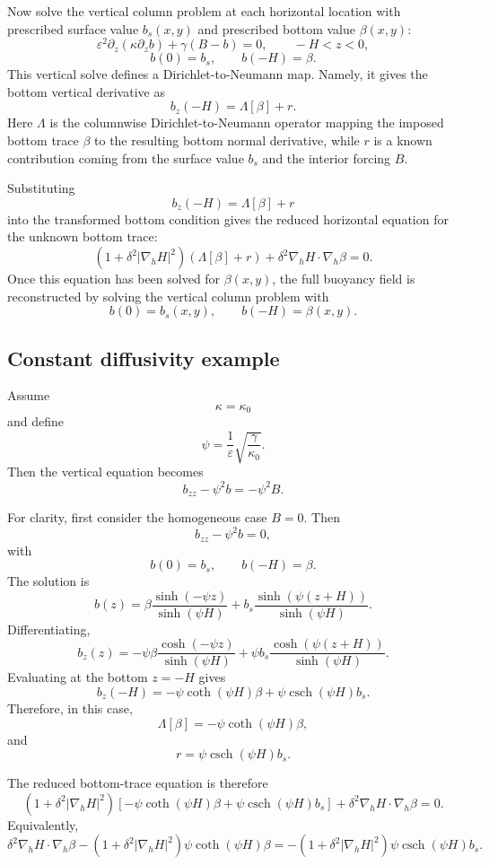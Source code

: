 \documentclass[11pt]{amsart}
\begin{document}
Now solve the vertical column problem at each horizontal location with prescribed surface value \(b_s(x,y)\) and prescribed bottom value \(\beta(x,y)\):
\[
\varepsilon^2 \partial_z\left(\kappa \partial_z b\right)
+\gamma(B-b)=0,
\qquad -H<z<0,
\]
\[
b(0)=b_s,
\qquad
b(-H)=\beta.
\]
This vertical solve defines a Dirichlet-to-Neumann map. Namely, it gives the bottom vertical derivative as
\[
b_z(-H)=\Lambda[\beta]+r.
\]
Here \(\Lambda\) is the columnwise Dirichlet-to-Neumann operator mapping the imposed bottom trace \(\beta\) to the resulting bottom normal derivative, while \(r\) is a known contribution coming from the surface value \(b_s\) and the interior forcing \(B\).

Substituting
\[
b_z(-H)=\Lambda[\beta]+r
\]
into the transformed bottom condition gives the reduced horizontal equation for the unknown bottom trace:
\[
\boxed{
\left(1+\delta^2 |\nabla_h H|^2\right)
\left(\Lambda[\beta]+r\right)
+
\delta^2 \nabla_h H\cdot \nabla_h \beta
=0.
}
\]
Once this equation has been solved for \(\beta(x,y)\), the full buoyancy field is reconstructed by solving the vertical column problem with
\[
b(0)=b_s(x,y),
\qquad
b(-H)=\beta(x,y).
\]

\subsection{Constant diffusivity example}

Assume
\[
\kappa=\kappa_0
\]
and define
\[
\psi=\frac{1}{\varepsilon}\sqrt{\frac{\gamma}{\kappa_0}}.
\]
Then the vertical equation becomes
\[
b_{zz}-\psi^2 b=-\psi^2 B.
\]

For clarity, first consider the homogeneous case \(B=0\). Then
\[
b_{zz}-\psi^2 b=0,
\]
with
\[
b(0)=b_s,
\qquad
b(-H)=\beta.
\]
The solution is
\[
b(z)
=
\beta
\frac{\sinh(-\psi z)}{\sinh(\psi H)}
+
b_s
\frac{\sinh(\psi(z+H))}{\sinh(\psi H)}.
\]
Differentiating,
\[
b_z(z)
=
-\psi\beta
\frac{\cosh(-\psi z)}{\sinh(\psi H)}
+
\psi b_s
\frac{\cosh(\psi(z+H))}{\sinh(\psi H)}.
\]
Evaluating at the bottom \(z=-H\) gives
\[
b_z(-H)
=
-\psi \coth(\psi H)\beta
+
\psi \operatorname{csch}(\psi H)b_s.
\]
Therefore, in this case,
\[
\Lambda[\beta]
=
-\psi \coth(\psi H)\beta,
\]
and
\[
r=
\psi \operatorname{csch}(\psi H)b_s.
\]

The reduced bottom-trace equation is therefore
\[
\left(1+\delta^2 |\nabla_h H|^2\right)
\left[
-\psi \coth(\psi H)\beta
+
\psi \operatorname{csch}(\psi H)b_s
\right]
+
\delta^2 \nabla_h H\cdot \nabla_h \beta
=0.
\]
Equivalently,
\[
\boxed{
\delta^2 \nabla_h H\cdot \nabla_h \beta
-
\left(1+\delta^2 |\nabla_h H|^2\right)
\psi \coth(\psi H)\beta
=
-
\left(1+\delta^2 |\nabla_h H|^2\right)
\psi \operatorname{csch}(\psi H)b_s.
}
\]
\end{document}
